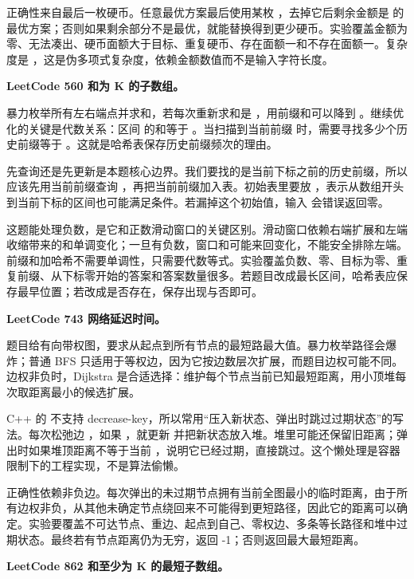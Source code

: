 正确性来自最后一枚硬币。任意最优方案最后使用某枚 ，去掉它后剩余金额是  的最优方案；否则如果剩余部分不是最优，就能替换得到更少硬币。实验覆盖金额为零、无法凑出、硬币面额大于目标、重复硬币、存在面额一和不存在面额一。复杂度是 ，这是伪多项式复杂度，依赖金额数值而不是输入字符长度。

\noindent\textbf{LeetCode 560 和为 K 的子数组。}

暴力枚举所有左右端点并求和，若每次重新求和是 ，用前缀和可以降到 。继续优化的关键是代数关系：区间 \code{(i,j]} 的和等于 。当扫描到当前前缀  时，需要寻找多少个历史前缀等于 。这就是哈希表保存历史前缀频次的理由。

先查询还是先更新是本题核心边界。我们要找的是当前下标之前的历史前缀，所以应该先用当前前缀查询 ，再把当前前缀加入表。初始表里要放 ，表示从数组开头到当前下标的区间也可能满足条件。若漏掉这个初始值，输入 \code{[k]} 会错误返回零。

这题能处理负数，是它和正数滑动窗口的关键区别。滑动窗口依赖右端扩展和左端收缩带来的和单调变化；一旦有负数，窗口和可能来回变化，不能安全排除左端。前缀和加哈希不需要单调性，只需要代数等式。实验覆盖负数、零、目标为零、重复前缀、从下标零开始的答案和答案数量很多。若题目改成最长区间，哈希表应保存最早位置；若改成是否存在，保存出现与否即可。

\noindent\textbf{LeetCode 743 网络延迟时间。}

题目给有向带权图，要求从起点到所有节点的最短路最大值。暴力枚举路径会爆炸；普通 BFS 只适用于等权边，因为它按边数层次扩展，而题目边权可能不同。边权非负时，Dijkstra 是合适选择：维护每个节点当前已知最短距离，用小顶堆每次取距离最小的候选扩展。

C++ 的  不支持 decrease-key，所以常用“压入新状态、弹出时跳过过期状态”的写法。每次松弛边 ，如果 ，就更新  并把新状态放入堆。堆里可能还保留旧距离；弹出时如果堆顶距离不等于当前 ，说明它已经过期，直接跳过。这个懒处理是容器限制下的工程实现，不是算法偷懒。

正确性依赖非负边。每次弹出的未过期节点拥有当前全图最小的临时距离，由于所有边权非负，从其他未确定节点绕回来不可能得到更短路径，因此它的距离可以确定。实验要覆盖不可达节点、重边、起点到自己、零权边、多条等长路径和堆中过期状态。最终若有节点距离仍为无穷，返回 -1；否则返回最大最短距离。

\noindent\textbf{LeetCode 862 和至少为 K 的最短子数组。}

